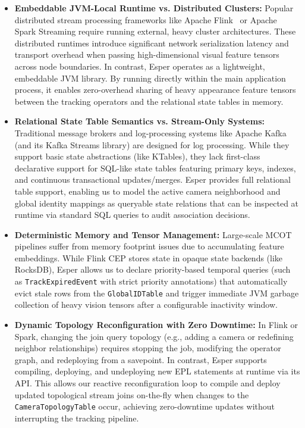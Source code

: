 \documentclass[11pt]{article}
\begin{document}
\begin{itemize}[leftmargin=*]
    \item \textbf{Embeddable JVM-Local Runtime vs. Distributed Clusters:} Popular distributed stream processing frameworks like Apache Flink~\cite{carbone2015flink} or Apache Spark Streaming require running external, heavy cluster architectures. These distributed runtimes introduce significant network serialization latency and transport overhead when passing high-dimensional visual feature tensors across node boundaries. In contrast, Esper operates as a lightweight, embeddable JVM library. By running directly within the main application process, it enables zero-overhead sharing of heavy appearance feature tensors between the tracking operators and the relational state tables in memory.
    \item \textbf{Relational State Table Semantics vs. Stream-Only Systems:} Traditional message brokers and log-processing systems like Apache Kafka~\cite{kreps2011kafka} (and its Kafka Streams library) are designed for log processing. While they support basic state abstractions (like KTables), they lack first-class declarative support for SQL-like state tables featuring primary keys, indexes, and continuous transactional updates/merges. Esper provides full relational table support, enabling us to model the active camera neighborhood and global identity mappings as queryable state relations that can be inspected at runtime via standard SQL queries to audit association decisions.
    \item \textbf{Deterministic Memory and Tensor Management:} Large-scale MCOT pipelines suffer from memory footprint issues due to accumulating feature embeddings. While Flink CEP stores state in opaque state backends (like RocksDB), Esper allows us to declare priority-based temporal queries (such as \texttt{TrackExpiredEvent} with strict priority annotations) that automatically evict stale rows from the \texttt{GlobalIDTable} and trigger immediate JVM garbage collection of heavy vision tensors after a configurable inactivity window.
    \item \textbf{Dynamic Topology Reconfiguration with Zero Downtime:} In Flink or Spark, changing the join query topology (e.g., adding a camera or redefining neighbor relationships) requires stopping the job, modifying the operator graph, and redeploying from a savepoint. In contrast, Esper supports compiling, deploying, and undeploying new EPL statements at runtime via its API. This allows our reactive reconfiguration loop to compile and deploy updated topological stream joins on-the-fly when changes to the \texttt{CameraTopologyTable} occur, achieving zero-downtime updates without interrupting the tracking pipeline.

\end{itemize}
\end{document}

